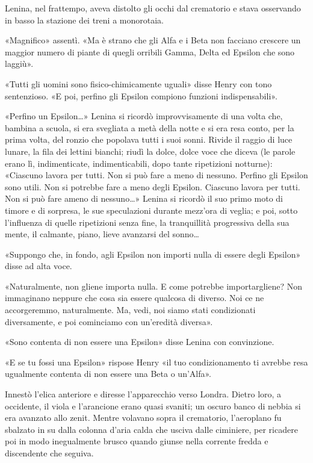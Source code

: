 \documentclass[
a5paper, %
10pt, %
twoside, 
onecolumn, %
openany, %
]{memoir}
\begin{document}
Lenina, nel frattempo, aveva distolto gli occhi dal crematorio e stava osservando in basso la stazione dei treni a monorotaia.

«Magnifico» assentì. «Ma è strano che gli Alfa e i Beta non facciano crescere un maggior numero di piante di quegli orribili Gamma, Delta ed Epsilon che sono laggiù».

«Tutti gli uomini sono fisico-chimicamente uguali» disse Henry con tono sentenzioso. «E poi, perfino gli Epsilon compiono funzioni indispensabili».

«Perfino un Epsilon…» Lenina si ricordò improvvisamente di una volta che, bambina a scuola, si era svegliata a metà della notte e si era resa conto, per la prima volta, del ronzio che popolava tutti i suoi sonni. Rivide il raggio di luce lunare, la fila dei lettini bianchi; riudì la dolce, dolce voce che diceva (le parole erano lì, indimenticate, indimenticabili, dopo tante ripetizioni notturne): «Ciascuno lavora per tutti. Non si può fare a meno di nessuno. Perfino gli Epsilon sono utili. Non si potrebbe fare a meno degli Epsilon. Ciascuno lavora per tutti. Non si può fare ameno di nessuno…» Lenina si ricordò il suo primo moto di timore e di sorpresa, le sue speculazioni durante mezz’ora di veglia; e poi, sotto l’influenza di quelle ripetizioni senza fine, la tranquillità progressiva della sua mente, il calmante, piano, lieve avanzarsi del sonno…

«Suppongo che, in fondo, agli Epsilon non importi nulla di essere degli Epsilon» disse ad alta voce.

«Naturalmente, non gliene importa nulla. E come potrebbe importargliene? Non immaginano neppure che cosa sia essere qualcosa di diverso. Noi ce ne accorgeremmo, naturalmente. Ma, vedi, noi siamo stati condizionati diversamente, e poi cominciamo con un’eredità diversa».

«Sono contenta di non essere una Epsilon» disse Lenina con convinzione.

«E se tu fossi una Epsilon» rispose Henry «il tuo condizionamento ti avrebbe resa ugualmente contenta di non essere una Beta o un’Alfa».

Innestò l’elica anteriore e diresse l’apparecchio verso Londra. Dietro loro, a occidente, il viola e l’arancione erano quasi svaniti; un oscuro banco di nebbia si era avanzato allo zenit. Mentre volavano sopra il crematorio, l’aeroplano fu sbalzato in su dalla colonna d’aria calda che usciva dalle ciminiere, per ricadere poi in modo inegualmente brusco quando giunse nella corrente fredda e discendente che seguiva.
\end{document}
